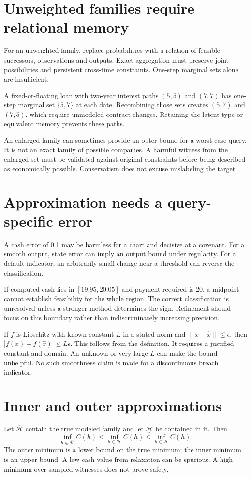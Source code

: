 \section{Unweighted families require relational memory}
For an unweighted family, replace probabilities with a relation of feasible successors, observations and outputs. Exact aggregation must preserve joint possibilities and persistent cross-time constraints. One-step marginal sets alone are insufficient.

A fixed-or-floating loan with two-year interest paths $(5,5)$ and $(7,7)$ has one-step marginal set $\{5,7\}$ at each date. Recombining those sets creates $(5,7)$ and $(7,5)$, which require unmodeled contract changes. Retaining the latent type or equivalent memory prevents these paths.

An enlarged family can sometimes provide an outer bound for a worst-case query. It is not an exact family of possible companies. A harmful witness from the enlarged set must be validated against original constraints before being described as economically possible. Conservatism does not excuse mislabeling the target.

\section{Approximation needs a query-specific error}
A cash error of 0.1 may be harmless for a chart and decisive at a covenant. For a smooth output, state error can imply an output bound under regularity. For a default indicator, an arbitrarily small change near a threshold can reverse the classification.

If computed cash lies in $[19.95,20.05]$ and payment required is 20, a midpoint cannot establish feasibility for the whole region. The correct classification is unresolved unless a stronger method determines the sign. Refinement should focus on this boundary rather than indiscriminately increasing precision.

If $f$ is Lipschitz with known constant $L$ in a stated norm and $\|x-\hat x\|\leq\epsilon$, then $|f(x)-f(\hat x)|\leq L\epsilon$. This follows from the definition. It requires a justified constant and domain. An unknown or very large $L$ can make the bound unhelpful. No such smoothness claim is made for a discontinuous breach indicator.

\section{Inner and outer approximations}
Let $\overline{\mathcal H}$ contain the true modeled family and let $\underline{\mathcal H}$ be contained in it. Then
\begin{equation}
 \inf_{h\in\overline{\mathcal H}}C(h)\leq\inf_{h\in\mathcal H}C(h)\leq\inf_{h\in\underline{\mathcal H}}C(h).
 \label{sim:inner-outer}
\end{equation}
The outer minimum is a lower bound on the true minimum; the inner minimum is an upper bound. A low cash value from relaxation can be spurious. A high minimum over sampled witnesses does not prove safety.

